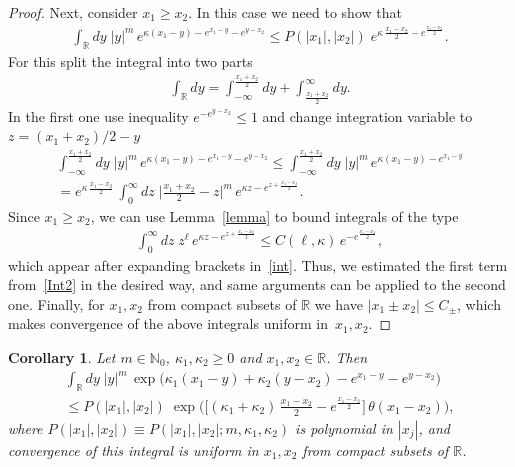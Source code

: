 \documentclass[11pt]{article}
\numberwithin{equation}{section}
\theoremstyle{plain}
\newtheorem{corollary}{Corollary}
\theoremstyle{definition}
\begin{document}
\begin{proof}
	Next, consider $x_1 \geq x_2$. In this case we need to show that
	\begin{align}\label{Ineq2}
		\int_{\mathbb{R}} dy\; |y|^m \, e^{ \kappa (x_1 - y) - e^{x_1 - y} - e^{y - x_2}} \leq P(|x_1|, |x_2|) \; e^{ \kappa \, \frac{x_1 - x_2}{2} - e^{ \frac{x_1 - x_2}{2} }  }.
	\end{align}
	For this split the integral into two parts
	\begin{align}\label{Int2}
		\int_{\mathbb{R}} dy = \int_{-\infty}^{ \frac{x_1 + x_2}{2} } dy + \int_{ \frac{x_1 + x_2}{2} }^{\infty}dy. 
	\end{align}
	In the first one use inequality $e^{-e^{y - x_2}} \leq 1$ and change integration variable to $z = (x_1 + x_2)/2 - y$
	\begin{multline}
		\int_{-\infty}^{ \frac{x_1 + x_2}{2} }  dy \; |y| ^m \, e^{\kappa (x_1 - y) - e^{x_1 - y} - e^{y - x_2}} \leq \int_{-\infty}^{ \frac{x_1 + x_2}{2} } dy \; |y|^m \, e^{\kappa (x_1 - y) - e^{x_1 - y}} \\[6pt] \label{int}
		= e^{ \kappa \, \frac{x_1 - x_2 }{2} } \, \int_{0}^{\infty} dz \; \biggl| \frac{x_1 + x_2}{2} - z \biggr|^m \, e^{\kappa z- e^{z + \frac{x_1 - x_2}{2}}}. 
	\end{multline}
	Since $x_1 \geq x_2$, we can use Lemma~\ref{lemma} to bound integrals of the type
	\begin{align}
		\int_{0}^{\infty} dz \; z^\ell \, e^{\kappa z - e^{z + \frac{x_1 - x_2}{2}}} \leq C(\ell, \kappa) \, e^{- e^{\frac{x_1 - x_2}{2}}},
	\end{align}
	which appear after expanding brackets in~\eqref{int}. Thus, we estimated the first term from~\eqref{Int2} in the desired way, and same arguments can be applied to the second one. Finally, for $x_1, x_2$ from compact subsets of $\mathbb{R}$ we have $|x_1 \pm x_2| \leq C_\pm$, which makes convergence of the above integrals uniform in~$x_1, x_2$.
\end{proof}

\begin{corollary} \label{corlem2}
	Let $m \in \mathbb{N}_0$, $\kappa_1, \kappa_2 \geq 0$ and $x_1, x_2 \in \mathbb{R}$. Then
	\begin{multline}
		\int_{\mathbb{R}} dy\; |y|^m \, \exp\bigl(\kappa_1 (x_1 - y) + \kappa_2 (y - x_2) - e^{x_1 - y} - e^{y - x_2} \bigr) \\
		\leq P(|x_1|, |x_2|) \; \exp \biggl( \biggl[ (\kappa_1 + \kappa_2) \, \frac{x_1 - x_2}{2} -e^{ \frac{x_1 - x_2}{2} } \biggr] \, \theta(x_1 - x_2) \biggr),
	\end{multline}
	where $P(|x_1|, |x_2|) \equiv P(|x_1|, |x_2|; m, \kappa_1, \kappa_2)$ is polynomial in $|x_j|$, and convergence of this integral is uniform in $x_1, x_2$ from compact subsets of $\mathbb{R}$.
\end{corollary}
\end{document}
